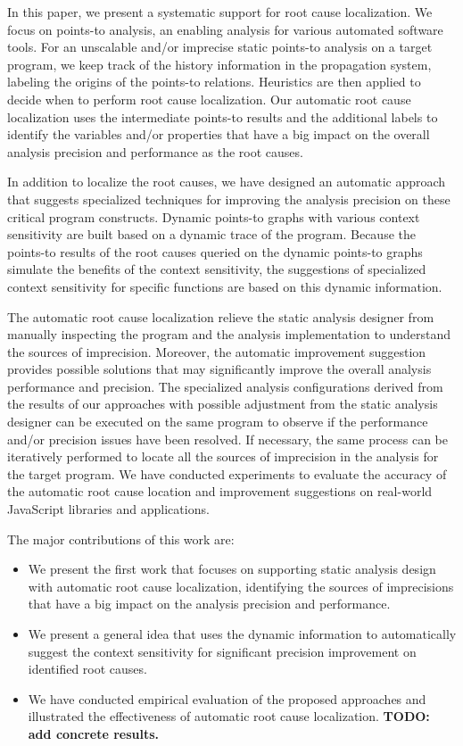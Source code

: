 In this paper, we present a systematic support for root cause localization. We focus on points-to analysis, an enabling analysis for various automated software tools. For an unscalable and/or imprecise static points-to analysis on a target program, we keep track of the history information in the propagation system, labeling the origins of the points-to relations. Heuristics are then applied to decide when to perform root cause localization. Our automatic root cause localization uses the intermediate points-to results and the additional labels to identify the variables and/or properties that have a big impact on the overall analysis precision and performance as the root causes.

In addition to localize the root causes, we have designed an automatic approach that suggests specialized techniques for improving the analysis precision on these critical program constructs. Dynamic points-to graphs with various context sensitivity are built based on a dynamic trace of the program. Because the points-to results of the root causes queried on the dynamic points-to graphs simulate the benefits of the context sensitivity, the suggestions of specialized context sensitivity for specific functions are based on this dynamic information.

The automatic root cause localization relieve the static analysis designer from manually inspecting the program and the analysis implementation to understand the sources of imprecision. Moreover, the automatic improvement suggestion provides possible solutions that may significantly improve the overall analysis performance and precision. The specialized analysis configurations derived from the results of our approaches with possible adjustment from the static analysis designer can be executed on the same program to observe if the performance and/or precision issues have been resolved. If necessary, the same process can be iteratively performed to locate all the sources of imprecision in the analysis for the target program. We have conducted experiments to evaluate the accuracy of the automatic root cause location and improvement suggestions on real-world JavaScript libraries and applications.

The major contributions of this work are:

\begin{itemize}

\item We present the first work that focuses on supporting static analysis design with automatic root cause localization, identifying the sources of imprecisions that have a big impact on the analysis precision and performance.

\item We present a general idea that uses the dynamic information to automatically suggest the context sensitivity for significant precision improvement on identified root causes.

\item We have conducted empirical evaluation of the proposed approaches and illustrated the effectiveness of automatic root cause localization. {\bf TODO: add concrete results.}

\end{itemize}

